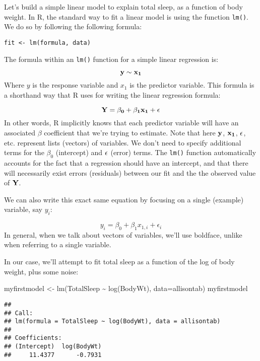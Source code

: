 \documentclass[
]{book}
\newenvironment{Shaded}{\begin{snugshade}}{\end{snugshade}}
\newcommand{\AttributeTok}[1]{\textcolor[rgb]{0.77,0.63,0.00}{#1}}
\newcommand{\FunctionTok}[1]{\textcolor[rgb]{0.00,0.00,0.00}{#1}}
\newcommand{\NormalTok}[1]{#1}
\newcommand{\OtherTok}[1]{\textcolor[rgb]{0.56,0.35,0.01}{#1}}
\newcommand{\SpecialCharTok}[1]{\textcolor[rgb]{0.00,0.00,0.00}{#1}}
\begin{document}
Let's build a simple linear model to explain total sleep, as a function of body weight. In R, the standard way to fit a linear model is using the function \texttt{lm()}. We do so by following the following formula:

\texttt{fit\ \textless{}-\ lm(formula,\ data)}

The formula within an \texttt{lm()} function for a simple linear regression is:

\[\bf{y} \sim \bf{x_1}\]
Where \(y\) is the response variable and \(x_1\) is the predictor variable. This formula is a shorthand way that R uses for writing the linear regression formula:

\[\bf{Y} = \beta_0 + \beta_1 \bf{x_1} + \bf{\epsilon}\]
In other words, R implicitly knows that each predictor variable will have an associated \(\beta\) coefficient that we're trying to estimate. Note that here \(\bf{y}\), \(\bf{x_1}\), \(\bf{\epsilon}\), etc. represent lists (vectors) of variables. We don't need to specify additional terms for the \(\beta_0\) (intercept) and \(\bf{\epsilon}\) (error) terms. The \texttt{lm()} function automatically accounts for the fact that a regression should have an intercept, and that there will necessarily exist errors (residuals) between our fit and the the observed value of \(\bf{Y}\).

We can also write this exact same equation by focusing on a single (example) variable, say \(y_i\):

\[y_i = \beta_0 + \beta_1 x_{1,i} + \epsilon_i\]
In general, when we talk about vectors of variables, we'll use boldface, unlike when referring to a single variable.

In our case, we'll attempt to fit total sleep as a function of the log of body weight, plus some noise:

\begin{Shaded}
\begin{Highlighting}[]
\NormalTok{myfirstmodel }\OtherTok{\textless{}{-}} \FunctionTok{lm}\NormalTok{(TotalSleep }\SpecialCharTok{\textasciitilde{}} \FunctionTok{log}\NormalTok{(BodyWt), }\AttributeTok{data=}\NormalTok{allisontab) }
\NormalTok{myfirstmodel}
\end{Highlighting}
\end{Shaded}

\begin{verbatim}
## 
## Call:
## lm(formula = TotalSleep ~ log(BodyWt), data = allisontab)
## 
## Coefficients:
## (Intercept)  log(BodyWt)  
##     11.4377      -0.7931
\end{verbatim}
\end{document}
